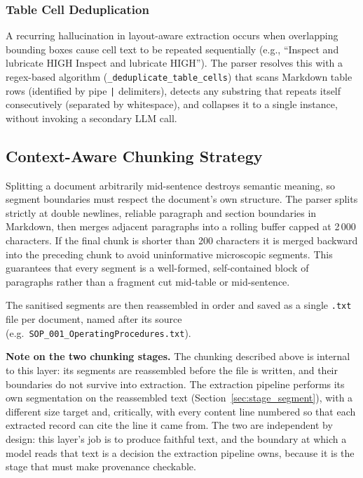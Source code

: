 \documentclass[11pt]{article}
\begin{document}
\subsubsection{Table Cell Deduplication}
A recurring hallucination in layout-aware extraction occurs when overlapping
bounding boxes cause cell text to be repeated sequentially
(e.g., ``Inspect and lubricate HIGH Inspect and lubricate HIGH'').
The parser resolves this with a regex-based algorithm
(\texttt{\_deduplicate\_table\_cells}) that scans Markdown table rows (identified
by pipe \texttt{|} delimiters), detects any substring that repeats itself
consecutively (separated by whitespace), and collapses it to a single instance,
without invoking a secondary LLM call.

\subsection{Context-Aware Chunking Strategy}
Splitting a document arbitrarily mid-sentence destroys semantic meaning, so
segment boundaries must respect the document's own structure.
The parser splits strictly at double newlines, reliable paragraph and
section boundaries in Markdown, then merges adjacent paragraphs into a
rolling buffer capped at 2\,000 characters.
If the final chunk is shorter than 200 characters it is merged backward into the
preceding chunk to avoid uninformative microscopic segments. This guarantees
that every segment is a well-formed, self-contained block of paragraphs
rather than a fragment cut mid-table or mid-sentence.

The sanitised segments are then reassembled in order and saved as a single
\texttt{.txt} file per document, named after its source (e.g.\
\texttt{SOP\_001\_OperatingProcedures.txt}).

\textbf{Note on the two chunking stages.} The chunking described above is
internal to this layer: its segments are reassembled before the file is written,
and their boundaries do not survive into extraction. The extraction pipeline
performs its own segmentation on the reassembled text
(Section~\ref{sec:stage_segment}), with a different size target and, critically,
with every content line numbered so that each extracted record can cite the line
it came from. The two are independent by design: this layer's job is to
produce faithful text, and the boundary at which a model reads that text is a
decision the extraction pipeline owns, because it is the stage that must make
provenance checkable.
\end{document}
